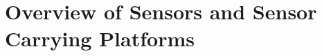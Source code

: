 \chapter{Overview of Sensors and Sensor Carrying Platforms}
\label{chap:today}

\begin{comment}
Marine biological diversity is already exposed to climate change, overfishing and other man-made disruptions. As if this were not enough, plastic pollution also causes huge damage to the marine environment. (*)
\\
335 million metric tons of plastic was produced in 2016. %
It is projected that the production will nearly double within the next 10-15 years
\\\\


\end{comment}

